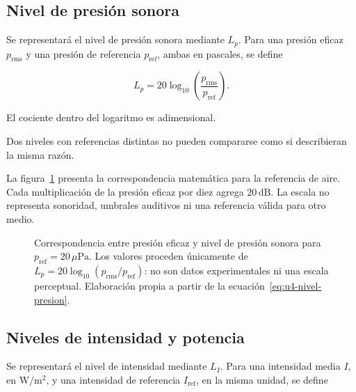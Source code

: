 \subsection{Nivel de presión sonora}
\label{sec:u4-nivel-presion}

Se representará el nivel de presión sonora mediante \(L_p\). Para una presión
eficaz \(p_\mathrm{rms}\) y una presión de referencia
\(p_\mathrm{ref}\), ambas en pascales, se define

\begin{equation}
    L_p=20\log_{10}\!\left(
        \frac{p_\mathrm{rms}}{p_\mathrm{ref}}\right).
    \label{eq:u4-nivel-presion}
\end{equation}

El cociente dentro del logaritmo es adimensional. 

Dos niveles con referencias distintas no pueden compararse como si
describieran la misma razón.

La figura~\ref{fig:u4-escala-presion-db-spl} presenta la correspondencia
matemática para la referencia de aire. Cada multiplicación de la presión
eficaz por diez agrega \(20\,\text{dB}\). La escala no representa sonoridad,
umbrales auditivos ni una referencia válida para otro medio.

\begin{figure}[htbp]
    \centering
    
    \caption{Correspondencia entre presión eficaz y nivel de presión sonora
    para \(p_\mathrm{ref}=20\,\mu\text{Pa}\). Los valores proceden únicamente
    de \(L_p=20\log_{10}(p_\mathrm{rms}/p_\mathrm{ref})\): no son datos
    experimentales ni una escala perceptual. Elaboración propia a partir de la
    ecuación~\eqref{eq:u4-nivel-presion}.}
    \label{fig:u4-escala-presion-db-spl}
\end{figure}

\subsection{Niveles de intensidad y potencia}
\label{sec:u4-niveles-energia}

Se representará el nivel de intensidad mediante \(L_I\). Para una intensidad
media \(I\), en \(\text{W}/\text{m}^2\), y una intensidad de referencia
\(I_\mathrm{ref}\), en la misma unidad, se define

